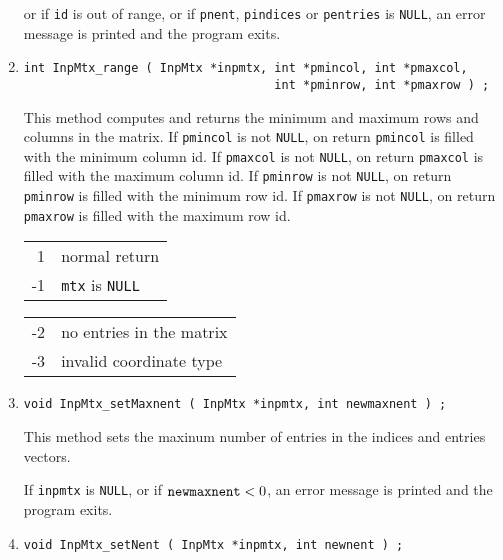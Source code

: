 \begin{enumerate}
or if {\tt id} is out of range,
or if {\tt pnent}, {\tt pindices} or {\tt pentries} is {\tt NULL},
an error message is printed and the program exits.
\item
\begin{verbatim}
int InpMtx_range ( InpMtx *inpmtx, int *pmincol, int *pmaxcol,
                                   int *pminrow, int *pmaxrow ) ;
\end{verbatim}
This method computes and returns the minimum and maximum rows and
columns in the matrix.
If {\tt pmincol} is not {\tt NULL}, on return {\tt *pmincol}
is filled with the minimum column id.
If {\tt pmaxcol} is not {\tt NULL}, on return {\tt *pmaxcol}
is filled with the maximum column id.
If {\tt pminrow} is not {\tt NULL}, on return {\tt *pminrow}
is filled with the minimum row id.
If {\tt pmaxrow} is not {\tt NULL}, on return {\tt *pmaxrow}
is filled with the maximum row id.
\par {}
\begin{center}
\begin{tabular}{rl}
 1 & normal return \\
-1 & {\tt mtx} is {\tt NULL} \\
\end{tabular}
\quad
\begin{tabular}{rl}
-2 & no entries in the matrix \\
-3 & invalid coordinate type
\end{tabular}
\end{center}
\item
\begin{verbatim}
void InpMtx_setMaxnent ( InpMtx *inpmtx, int newmaxnent ) ;
\end{verbatim}
This method sets the maxinum number of entries in the indices and
entries vectors.
\par {}
If {\tt inpmtx} is {\tt NULL}, or if ${\tt newmaxnent} < 0$,
an error message is printed and the program exits.
\item
\begin{verbatim}
void InpMtx_setNent ( InpMtx *inpmtx, int newnent ) ;
\end{verbatim}

\end{enumerate}
